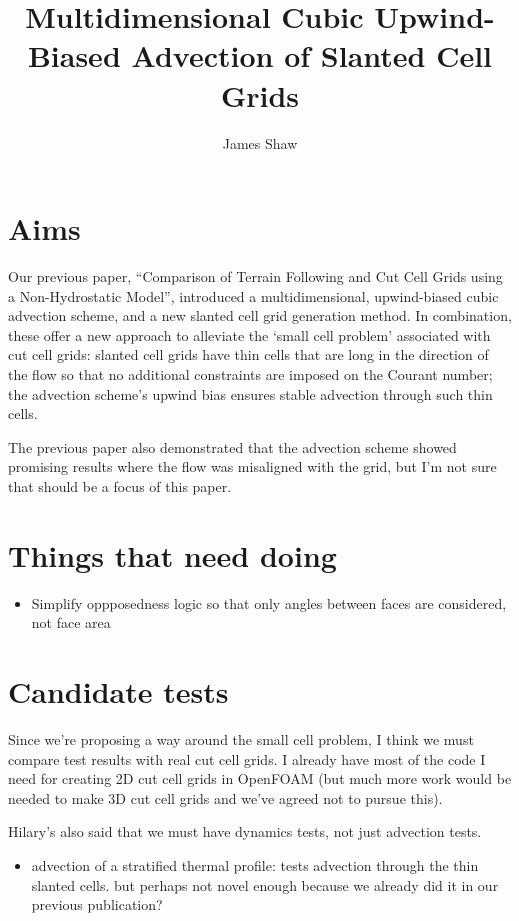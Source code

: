 \documentclass{article}
\title{Multidimensional Cubic Upwind-Biased Advection of Slanted Cell Grids}
\author{James Shaw}
\begin{document}
\maketitle
\section{Aims}
Our previous paper, ``Comparison of Terrain Following and Cut Cell Grids using a Non-Hydrostatic Model'', introduced a multidimensional, upwind-biased cubic advection scheme, and a new slanted cell grid generation method.  In combination, these offer a new approach to alleviate the `small cell problem' associated with cut cell grids: slanted cell grids have thin cells that are long in the direction of the flow so that no additional constraints are imposed on the Courant number; the advection scheme's upwind bias ensures stable advection through such thin cells.

The previous paper also demonstrated that the advection scheme showed promising results where the flow was misaligned with the grid, but I'm not sure that should be a focus of this paper.

\section{Things that need doing}
\begin{itemize}
	\item Simplify oppposedness logic so that only angles between faces are considered, not face area
\end{itemize}

\section{Candidate tests}
Since we're proposing a way around the small cell problem, I think we must compare test results with real cut cell grids.  I already have most of the code I need for creating 2D cut cell grids in OpenFOAM (but much more work would be needed to make 3D cut cell grids and we've agreed not to pursue this).

Hilary's also said that we must have dynamics tests, not just advection tests.

\begin{itemize}
	\item advection of a stratified thermal profile: tests advection through the thin slanted cells. but perhaps not novel enough because we already did it in our previous publication?
\end{itemize}
\end{document}
